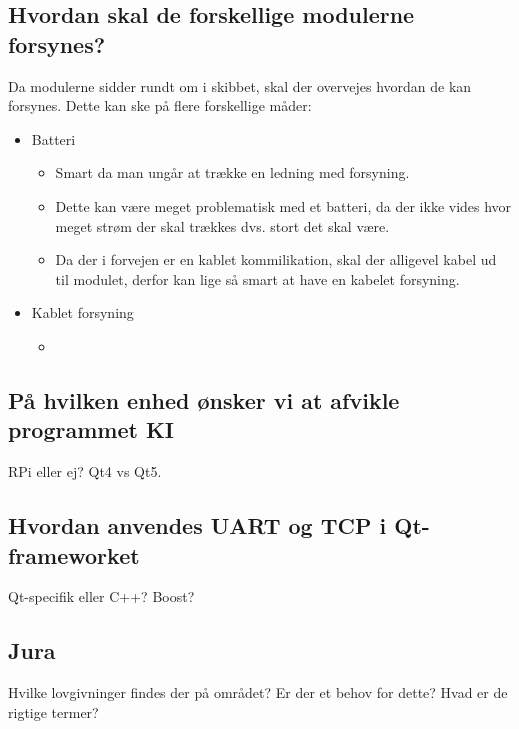 \subsection{Hvordan skal de forskellige modulerne forsynes?}
Da modulerne sidder rundt om i skibbet, skal der overvejes hvordan de kan forsynes. Dette kan ske på flere forskellige måder:
\begin{itemize}
\item Batteri
	\begin{itemize}
	\item Smart da man ungår at trække en ledning med forsyning.
	\item Dette kan være meget problematisk med et batteri, da der ikke vides hvor meget strøm der skal trækkes dvs. stort det skal være. 
	\item Da der i forvejen er en kablet kommilikation, skal der alligevel kabel ud til modulet, derfor kan lige så smart at have en kabelet forsyning.
	\end{itemize}
\item Kablet forsyning
	\begin{itemize}
	\item 
	\end{itemize} 

\end{itemize}


\subsection{På hvilken enhed ønsker vi at afvikle programmet KI}
RPi eller ej? Qt4 vs Qt5.
\subsection{Hvordan anvendes UART og TCP i Qt-frameworket}
Qt-specifik eller C++? Boost? 

\subsection{Jura}
Hvilke lovgivninger findes der på området? Er der et behov for dette? Hvad er de rigtige termer? 

